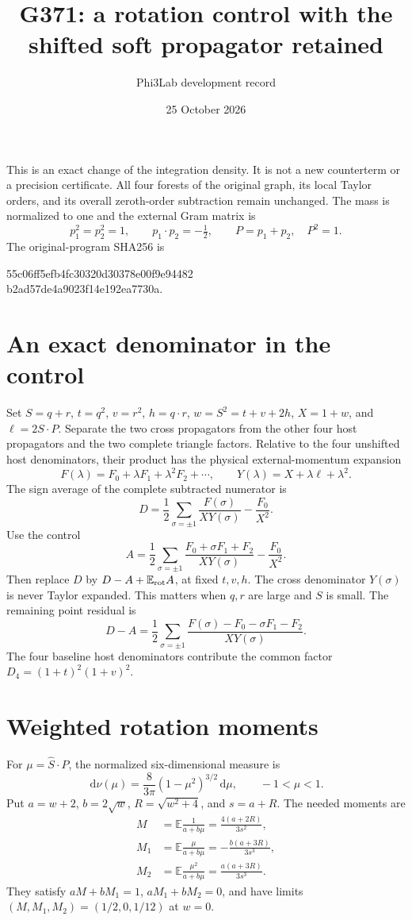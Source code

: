 \documentclass[11pt]{article}
\title{G371: a rotation control with the shifted soft propagator retained}
\author{Phi3Lab development record}
\date{25 October 2026}
\newcommand{\E}{\mathbb E}
\newcommand{\dd}{\,\mathrm d}
\begin{document}
\maketitle
\noindent This is an exact change of the integration density. It is not a new counterterm or a precision certificate. All four forests of the original graph, its local Taylor orders, and its overall zeroth-order subtraction remain unchanged. The mass is normalized to one and the external Gram matrix is
\[
 p_1^2=p_2^2=1,\qquad p_1\cdot p_2=-\tfrac12,\qquad P=p_1+p_2,\quad P^2=1.
\]
The original-program SHA256 is
\begin{center}\ttfamily\small
55c06ff5efb4fc30320d30378e00f9e94482\\
b2ad57de4a9023f14e192ea7730a.
\end{center}

\section*{An exact denominator in the control}
Set \(S=q+r\), \(t=q^2\), \(v=r^2\), \(h=q\cdot r\),
\(w=S^2=t+v+2h\), \(X=1+w\), and \(\ell=2S\cdot P\).
Separate the two cross propagators from the other four host propagators and the two complete triangle factors. Relative to the four unshifted host denominators, their product has the physical external-momentum expansion
\[
 F(\lambda)=F_0+\lambda F_1+\lambda^2F_2+\cdots,\qquad
 Y(\lambda)=X+\lambda\ell+\lambda^2.
\]
The sign average of the complete subtracted numerator is
\[
 D=\frac12\sum_{\sigma=\pm1}\frac{F(\sigma)}{X Y(\sigma)}
       -\frac{F_0}{X^2}.
\]
Use the control
\[
 A=\frac12\sum_{\sigma=\pm1}
 \frac{F_0+\sigma F_1+F_2}{X Y(\sigma)}-\frac{F_0}{X^2}.
\]
Then replace \(D\) by \(D-A+\E_{\rm rot} A\), at fixed \(t,v,h\).
The cross denominator \(Y(\sigma)\) is never Taylor expanded. This matters when
\(q,r\) are large and \(S\) is small. The remaining point residual is
\[
 D-A=\frac12\sum_{\sigma=\pm1}
 \frac{F(\sigma)-F_0-\sigma F_1-F_2}{X Y(\sigma)}.
\]
The four baseline host denominators contribute the common factor
\(D_4=(1+t)^2(1+v)^2\).

\section*{Weighted rotation moments}
For \(\mu=\widehat S\cdot P\), the normalized six-dimensional measure is
\[
 \dd\nu(\mu)=\frac8{3\pi}(1-\mu^2)^{3/2}\dd\mu,\qquad -1<\mu<1.
\]
Put \(a=w+2\), \(b=2\sqrt w\), \(R=\sqrt{w^2+4}\), and \(s=a+R\).
The needed moments are
\begin{align*}
 M&=\E\frac1{a+b\mu}=\frac{4(a+2R)}{3s^2},\\
 M_1&=\E\frac{\mu}{a+b\mu}=-\frac{b(a+3R)}{3s^3},\\
 M_2&=\E\frac{\mu^2}{a+b\mu}=\frac{a(a+3R)}{3s^3}.
\end{align*}
They satisfy \(aM+bM_1=1\), \(aM_1+bM_2=0\), and have limits
\((M,M_1,M_2)=(1/2,0,1/12)\) at \(w=0\).
\end{document}
